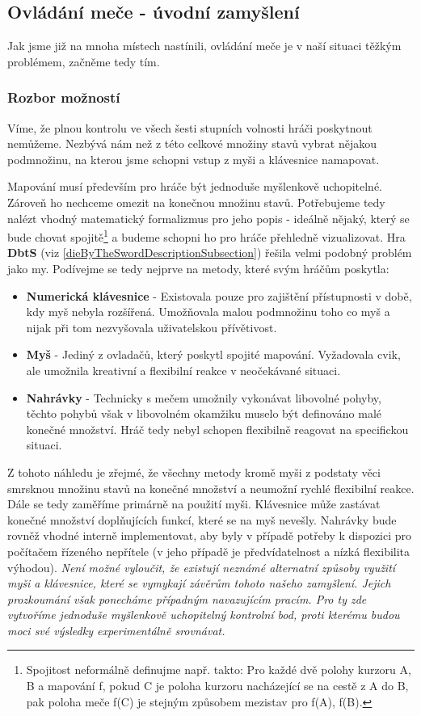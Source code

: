 \subsection{Ovládání meče - úvodní zamyšlení}

Jak jsme již na mnoha místech nastínili, ovládání meče je v naší situaci těžkým problémem, začněme tedy tím. 

\subsubsection*{Rozbor možností}

Víme, že plnou kontrolu ve všech šesti stupních volnosti hráči poskytnout nemůžeme. Nezbývá nám než z této celkové množiny stavů vybrat nějakou podmnožinu, na kterou jsme schopni vstup z myši a klávesnice namapovat.

Mapování musí především pro hráče být jednoduše myšlenkově uchopitelné. Zároveň ho nechceme omezit na konečnou množinu stavů. Potřebujeme tedy nalézt vhodný matematický formalizmus pro jeho popis - ideálně nějaký, který se bude chovat spojitě\footnote{Spojitost neformálně definujme např. takto: Pro každé dvě polohy kurzoru A, B a mapování f, pokud C je poloha kurzoru nacházející se na cestě z A do B, pak poloha meče f(C) je stejným způsobem mezistav pro f(A), f(B).} a budeme schopni ho pro hráče přehledně vizualizovat. 
\bigbreak
Hra \textbf{\acl{DbtS}} (viz \ref{dieByTheSwordDescriptionSubsection}) řešila velmi podobný problém jako my. Podívejme se tedy nejprve na metody, které svým hráčům poskytla:
\begin{itemize}
    \item \textbf{Numerická klávesnice} - Existovala pouze pro zajištění přístupnosti v době, kdy myš nebyla rozšířená. Umožňovala malou podmnožinu toho co myš a nijak při tom nezvyšovala uživatelskou přívětivost.
    \item \textbf{Myš} - Jediný z ovladačů, který poskytl spojité mapování. Vyžadovala cvik, ale umožnila kreativní a flexibilní reakce v neočekávané situaci.
    \item \textbf{Nahrávky} - Technicky s mečem umožnily vykonávat libovolné pohyby, těchto pohybů však v libovolném okamžiku muselo být definováno malé konečné množství. Hráč tedy nebyl schopen flexibilně reagovat na specifickou situaci. 
\end{itemize}
Z tohoto náhledu je zřejmé, že všechny metody kromě myši z podstaty věci smrsknou množinu stavů na konečné množství a neumožní rychlé flexibilní reakce. Dále se tedy zaměříme primárně na použití myši. Klávesnice může zastávat konečné množství doplňujících funkcí, které se na myš nevešly. Nahrávky bude rovněž vhodné interně implementovat, aby byly v případě potřeby k dispozici pro počítačem řízeného nepřítele (v jeho případě je předvídatelnost a nízká flexibilita výhodou).
\bigbreak
\textit{Není možné vyloučit, že existují neznámé alternatní způsoby využití myši a klávesnice, které se vymykají závěrům tohoto našeho zamyšlení. Jejich prozkoumání však ponecháme případným navazujícím pracím. Pro ty zde vytvoříme jednoduše myšlenkově uchopitelný kontrolní bod, proti kterému budou moci své výsledky experimentálně srovnávat.}

